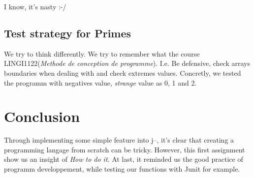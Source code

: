 \documentclass[10pt,a4paper]{article}
\begin{document}
I know, it's nasty :-/

\subsection{Test strategy for Primes}
We try to think differently. We try to remember what the course LINGI1122(\textit{Methode de conception de programme}). I.e. Be defensive, check arrays boundaries when dealing with and check extremes values. Concretly, we tested the programm with negatives value, \textit{strange} value as 0, 1 and 2. 
\section{Conclusion}

Through implementing some simple feature into j--, it's clear that creating a programming langage from scratch can be tricky. However, this first assignment show us an insight of \textit{How to do it}. At last, it reminded us the good practice of programm developpement, while testing our functions with Junit for example.
\end{document}
